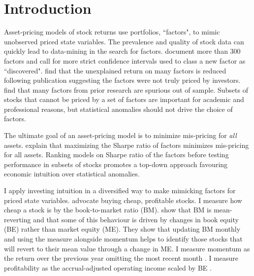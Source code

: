 
\section*{Introduction}


Asset-pricing models of stock returns use portfolios, ``factors", to mimic
unobserved priced state variables.
The prevalence and quality of stock data can quickly lead to data-mining in
the search for factors.
\textcite{harvey2016and} document more than 300 factors and call for more
strict confidence intervals used to class a new factor as ``discovered".
\textcite{mclean2016does} find that the unexplained return on many factors is
reduced following publication suggesting the factors were not truly priced by
investors.
\textcite{linnainmaa2016history} find that many factors from prior research are
spurious out of sample.
Subsets of stocks that cannot be priced by a set of factors are important for
academic and professional reasons, but statistical anomalies should not drive
the choice of factors.

The ultimate goal of an asset-pricing model is to minimize mis-pricing for
\emph{all} assets. \textcite{barillas2016alpha} explain that maximizing the
Sharpe ratio of factors minimizes mis-pricing for all assets. Ranking models on
Sharpe ratio of the factors before testing performance in subsets of stocks
promotes a top-down approach favouring economic intuition over statistical
anomalies.

I apply investing intuition in a diversified way to make mimicking factors for
priced state variables.
\textcite{graham1934security} advocate buying cheap, profitable stocks.
I measure how cheap a stock is by the book-to-market ratio (BM).
\textcite{kok2017facts} show that BM is mean-reverting and that some of this
behaviour is driven by changes in book equity (BE) rather than market equity
(ME).
They show that updating BM monthly and using the measure alongside momentum
helps to identify those stocks that will revert to their mean value through a
change in ME.
I measure momentum as the return over the previous year omitting the most
recent month \parencite{fama2016dissecting}.
I measure profitability as the accrual-adjusted operating income scaled by BE
\parencite{ball2016accruals}.

